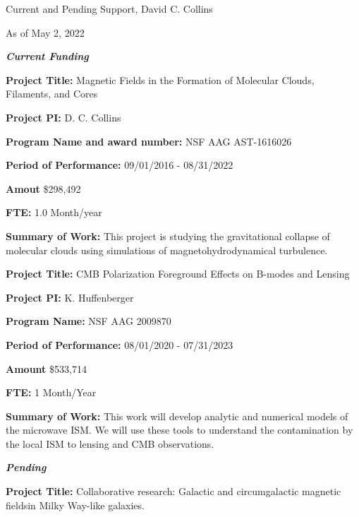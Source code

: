 \documentclass[10pt]{article}
\begin{document}
\newcommand{\LT}[1]{\noindent\textbf{#1}}
\begin{LARGE}
\noindent Current and Pending Support, David C. Collins
\end{LARGE}

As of May 2, 2022



\vspace{0.1in}

\noindent \large{\textbf{\emph{Current Funding}}}

\vspace{0.1in}

\LT{Project Title:} Magnetic Fields in the Formation of Molecular Clouds,
Filaments, and Cores

\LT{Project PI:} D. C. Collins

\LT{Program Name and award number:} NSF AAG  AST-1616026 

\LT{Period of Performance:} 09/01/2016 - 08/31/2022

\LT{Amout} \$298,492 

\LT{FTE:} 1.0 Month/year

\LT{Summary of Work:} This project is studying the gravitational collapse of
molecular clouds using simulations of magnetohydrodynamical turbulence.  

\vspace{0.1in}


\LT{Project Title:} CMB Polarization Foreground Effects on B-modes and Lensing

\LT{Project PI:} K. Huffenberger

\LT{Program Name:} NSF AAG 2009870

\LT{Period of Performance:} 08/01/2020 - 07/31/2023

\LT{Amount} \$533,714

\LT{FTE:} 1 Month/Year

\LT{Summary of Work:} 
This work will develop analytic and numerical models of the microwave ISM. We
will use these tools to understand the contamination by the local ISM to lensing
and CMB observations.

\vspace{0.1in}

\noindent \large{\textbf{\emph{Pending}}}

\LT{Project Title:} Collaborative research: Galactic and circumgalactic magnetic
fieldsin Milky Way-like galaxies.
\end{document}
